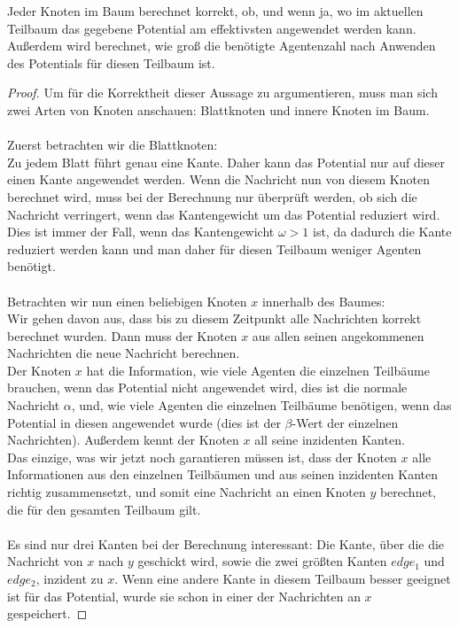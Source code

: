 	\begin{theorem}
		Jeder Knoten im Baum berechnet korrekt, ob, und wenn ja, wo im aktuellen Teilbaum das gegebene Potential am effektivsten angewendet werden kann. Außerdem wird berechnet, wie groß die benötigte Agentenzahl nach Anwenden des Potentials für diesen Teilbaum ist.
	\end{theorem}
	\begin{proof}
		Um für die Korrektheit dieser Aussage zu argumentieren, muss man sich zwei Arten von Knoten anschauen: Blattknoten und innere Knoten im Baum.\\
		\\
		Zuerst betrachten wir die Blattknoten:\\
		Zu jedem Blatt führt genau eine Kante. Daher kann das Potential nur auf dieser einen Kante angewendet werden. Wenn die Nachricht nun von diesem Knoten berechnet wird, muss bei der Berechnung nur überprüft werden, ob sich die Nachricht verringert, wenn das Kantengewicht um das Potential reduziert wird. Dies ist immer der Fall, wenn das Kantengewicht $\omega > 1$ ist, da dadurch die Kante reduziert werden kann und man daher für diesen Teilbaum weniger Agenten benötigt.
		\\
		\\
		Betrachten wir nun einen beliebigen Knoten $x$ innerhalb des Baumes:\\
		Wir gehen davon aus, dass bis zu diesem Zeitpunkt alle Nachrichten korrekt berechnet wurden. Dann muss der Knoten $x$ aus allen seinen angekommenen Nachrichten die neue Nachricht berechnen.\\
		Der Knoten $x$ hat die Information, wie viele Agenten die einzelnen Teilbäume brauchen, wenn das Potential nicht angewendet wird, dies ist die normale Nachricht $\alpha$, und, wie viele Agenten die einzelnen Teilbäume benötigen, wenn das Potential in diesen angewendet wurde (dies ist der $\beta$-Wert der einzelnen Nachrichten). Außerdem kennt der Knoten $x$ all seine inzidenten Kanten.\\
		Das einzige, was wir jetzt noch garantieren müssen ist, dass der Knoten $x$ alle Informationen aus den einzelnen Teilbäumen und aus seinen inzidenten Kanten richtig zusammensetzt, und somit eine Nachricht an einen Knoten $y$ berechnet, die für den gesamten Teilbaum gilt.\\
		\\
		Es sind nur drei Kanten bei der Berechnung interessant: Die Kante, über die die Nachricht von $x$ nach $y$ geschickt wird, sowie die zwei größten Kanten $edge_1$ und $edge_2$, inzident zu $x$. Wenn eine andere Kante in diesem Teilbaum besser geeignet ist für das Potential, wurde sie schon in einer der Nachrichten an $x$ gespeichert. 

\end{proof}
